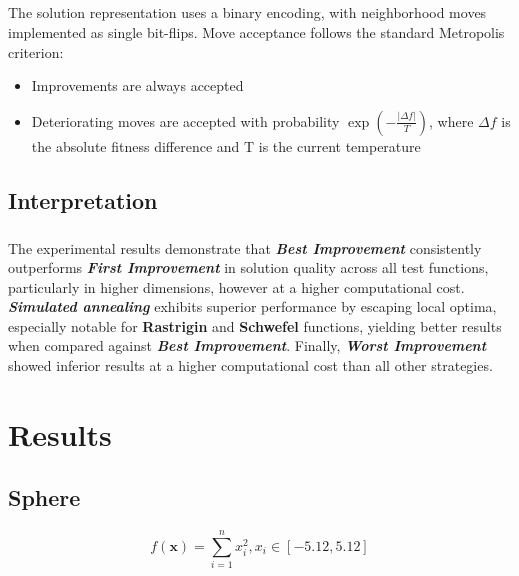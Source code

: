 \documentclass{article}
\begin{document}
\subparagraph{}
The solution representation uses a binary encoding, with neighborhood moves implemented as single bit-flips. Move acceptance follows the standard Metropolis criterion:
\begin{itemize}
    \item Improvements are always accepted
    \item Deteriorating moves are accepted with probability $\exp\left(-\frac{| \Delta f |}{T}\right)$, where $\Delta f$ is the absolute fitness difference and T is the current temperature
\end{itemize}

\subsection{Interpretation}

\subparagraph{}
The experimental results demonstrate that \textit{\textbf{Best Improvement}} consistently outperforms \textit{\textbf{First Improvement}} in solution quality across all test functions, particularly in higher dimensions, however at a higher computational cost. \textit{\textbf{Simulated annealing}} exhibits superior performance by escaping local optima, especially notable for \textbf{Rastrigin} and \textbf{Schwefel} functions, yielding better results when compared against \textit{\textbf{Best Improvement}}. Finally, \textit{\textbf{Worst Improvement}} showed inferior results at a higher computational cost than all other strategies.


\newpage
\section{Results}


\subsection{Sphere}
$$f(\mathbf{x}) = \sum_{i=1}^{n} x_i^2 , x_i \in \left[ -5.12, 5.12 \right] $$

\end{document}
